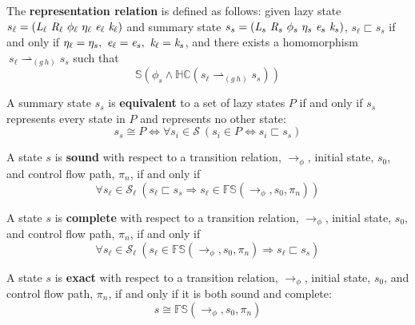 \begin{definition}
\label{representation}
The \textbf{representation relation} is defined as follows: given lazy state $s_\ell = ( \cfgnt{L}_\ell\ \cfgnt{R}_\ell\ \phi_\ell\ \eta_\ell\ \cfgnt{e}_\ell\ \cfgnt{k}_\ell )$ and summary state $s_s = ( \emph{L}_s\ \emph{R}_s\ \phi_s\ \eta_s\ \emph{e}_s\ \emph{k}_s )$, $s_\ell \sqsubset s_s $ if and only if $\eta_{\ell} = \eta_{s} ,\ \cfgnt{e}_{\ell} = \cfgnt{e}_{s} ,\ \cfgnt{k}_{\ell} = \cfgnt{k}_{s}$, and there exists a homomorphism $\ s_\ell \rightharpoonup_{(g\ h)} s_s $ such that 
\begin{equation}
\label{eqn:valid}
 \mathbb{S}( \phi_s \wedge \mathbb{HC}(s_\ell \rightharpoonup_{(g\ h)} s_s) ) 
\end{equation}
\end{definition}

\begin{definition}
\label{equivalent}
A summary state $s_s$ is \textbf{equivalent} to a set of lazy states $P$ if and only if $s_s$ represents every state in $P$ and represents no other state: 
$$s_s \cong P \Leftrightarrow \forall s_i \in \mathcal{S}\ (s_i \in P \Leftrightarrow s_i \sqsubset s_s) $$
\end{definition}

\begin{definition}
\label{sound}
A state $s$ is \textbf{sound} with respect to a transition relation, $\rightarrow_\phi$, initial state, $s_0$, and control flow path, $\pi_n$, if and only if 
$$ \forall s_\ell \in \mathcal{S}_\ell\ (s_\ell \sqsubset s_s \Rightarrow s_\ell \in \mathbb{FS}(\rightarrow_{\phi},s_0,\pi_n) ) $$
\end{definition}

\begin{definition}
\label{complete}
A state $s$ is \textbf{complete} with respect to a transition relation, $\rightarrow_\phi$, initial state, $s_0$, and control flow path, $\pi_n$, if and only if 
$$ \forall s_\ell \in \mathcal{S}_\ell\ ( s_\ell \in \mathbb{FS}(\rightarrow_{\phi},s_0,\pi_n)\Rightarrow s_\ell \sqsubset s_s ) $$
\end{definition}

\begin{definition}
\label{exact}
A state $s$ is \textbf{exact} with respect to a transition relation, $\rightarrow_\phi$, initial state, $s_0$, and control flow path, $\pi_n$, if and only if it is both sound and complete:
$$ s \cong \mathbb{FS}(\rightarrow_{\phi},s_0,\pi_n)$$
\end{definition}

